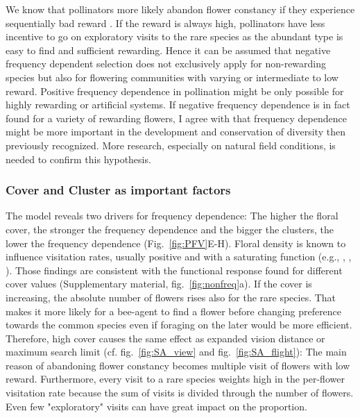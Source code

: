 We know that pollinators more likely abandon flower constancy if they experience sequentially bad reward \citep{chittka1997foraging,goulson1994model}. If the reward is always high, pollinators have less incentive to go on exploratory visits to the rare species as the abundant type is easy to find and sufficient rewarding. Hence it can be assumed that negative frequency dependent selection does not exclusively apply for non-rewarding species but also for flowering communities with varying or intermediate to low reward. Positive frequency dependence in pollination might be only possible for highly rewarding or artificial systems. If negative frequency dependence is in fact found for a variety of rewarding flowers, I agree with \cite{Eckhart2006frequency} that frequency dependence might be more important in the development and conservation of diversity then previously recognized. More research, especially on natural field conditions, is needed to confirm this hypothesis.



\subsubsection*{Cover and Cluster as important factors}

The model reveals two drivers for frequency dependence: The higher the floral cover, the stronger the frequency dependence and the bigger the clusters, the lower the frequency dependence (Fig.~\ref{fig:PFV}E-H). 
Floral density is known to influence visitation rates, usually positive and with a saturating function (e.g.\citealt{rathcke1983competition}, \citealt{essenberg2012explaining}, \citealt{bernhardt2008effects}, \citealt{Kunin1997}). Those findings are consistent with the functional response found for different cover values (Supplementary material, fig.~\ref{fig:nonfreq}a). If the cover is increasing, the absolute number of flowers rises also for the rare species. That makes it more likely for a bee-agent to find a flower before changing preference towards the common species even if foraging on the later would be more efficient. Therefore, high cover causes the same effect as expanded vision distance or maximum search limit (cf. fig.~\ref{fig:SA_view} and fig.~\ref{fig:SA_flight}): The main reason of abandoning flower constancy becomes multiple visit of flowers with low reward. Furthermore, every visit to a rare species weights high in the per-flower visitation rate because the sum of visits is divided through the number of flowers. Even few "exploratory" visits can have great impact on the proportion. 

